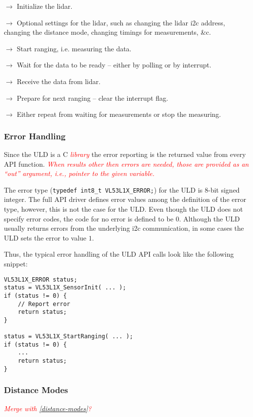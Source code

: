 \documentclass[
  digital,     %
  oneside,     %
  nosansbold,  %
  nocolorbold, %
  lof,         %
  lot,         %
]{fithesis4}
\newcommand{\TODO}[1]{\textcolor{red}{\textit{#1}}}
\begin{document}
$\rightarrow$ Initialize the \acrshort{lidar}.

$\rightarrow$ Optional settings for the \acrshort{lidar}, such as changing the \acrshort{lidar} \acrshort{i2c} address, changing the distance mode, changing timings for measurements, \&c.

$\rightarrow$ Start ranging, i.e. measuring the data.

$\rightarrow$ Wait for the data to be ready -- either by polling or by interrupt.

$\rightarrow$ Receive the data from \acrshort{lidar}.

$\rightarrow$ Prepare for next ranging -- clear the interrupt flag.

$\rightarrow$ Either repeat from waiting for measurements or stop the measuring.


\subsubsection{ Error Handling }

Since the ULD is a C \TODO{library} the error reporting is the returned value from every API function. \TODO{When results other then errors are needed, those are provided as an ``out'' argument, i.e., pointer to the given variable.}

The error type (\lstinline[breaklines=false]|typedef int8_t VL53L1X_ERROR;|) for the ULD is 8-bit signed integer. The full API driver defines error values among the definition of the error type, however, this is not the case for the ULD. Even though the ULD does not specify error codes, the code for no error is defined to be $0$. Although the ULD usually returns errors from the underlying \acrshort{i2c} communication, in some cases the ULD sets the error to value $1$.

Thus, the typical error handling of the ULD API calls look like the following snippet:

\begin{lstlisting}
VL53L1X_ERROR status;
status = VL53L1X_SensorInit( ... );
if (status != 0) {
    // Report error
    return status;
}

status = VL53L1X_StartRanging( ... );
if (status != 0) {
    ...
    return status;
}
\end{lstlisting}

\subsubsection{ Distance Modes }
\TODO{Merge with \ref{distance-modes}?}
\end{document}
